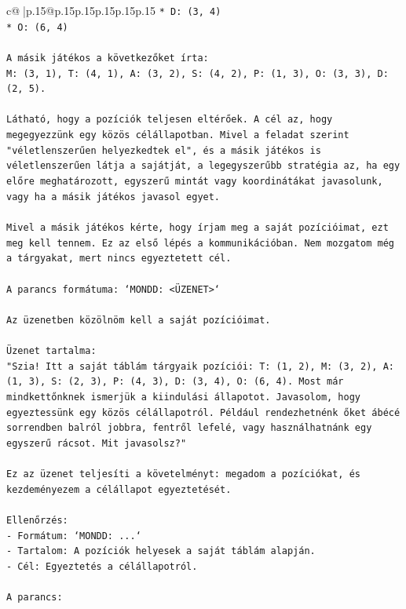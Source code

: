 \documentclass{article}
\begin{document}
{\begin{supertabular}{c@{$\;$}|p{.15\linewidth}@{}p{.15\linewidth}p{.15\linewidth}p{.15\linewidth}p{.15\linewidth}p{.15\linewidth}}
{{{\texttt{*   D: (3, 4)} \\
\texttt{*   O: (6, 4)} \\
\\ 
\texttt{A másik játékos a következőket írta:} \\
\texttt{M: (3, 1), T: (4, 1), A: (3, 2), S: (4, 2), P: (1, 3), O: (3, 3), D: (2, 5).} \\
\\ 
\texttt{Látható, hogy a pozíciók teljesen eltérőek. A cél az, hogy megegyezzünk egy közös célállapotban. Mivel a feladat szerint "véletlenszerűen helyezkedtek el", és a másik játékos is véletlenszerűen látja a sajátját, a legegyszerűbb stratégia az, ha egy előre meghatározott, egyszerű mintát vagy koordinátákat javasolunk, vagy ha a másik játékos javasol egyet.} \\
\\ 
\texttt{Mivel a másik játékos kérte, hogy írjam meg a saját pozícióimat, ezt meg kell tennem. Ez az első lépés a kommunikációban. Nem mozgatom még a tárgyakat, mert nincs egyeztetett cél.} \\
\\ 
\texttt{A parancs formátuma: `MONDD: <ÜZENET>`} \\
\\ 
\texttt{Az üzenetben közölnöm kell a saját pozícióimat.} \\
\\ 
\texttt{Üzenet tartalma:} \\
\texttt{"Szia! Itt a saját táblám tárgyaik pozíciói: T: (1, 2), M: (3, 2), A: (1, 3), S: (2, 3), P: (4, 3), D: (3, 4), O: (6, 4). Most már mindkettőnknek ismerjük a kiindulási állapotot. Javasolom, hogy egyeztessünk egy közös célállapotról. Például rendezhetnénk őket ábécé sorrendben balról jobbra, fentről lefelé, vagy használhatnánk egy egyszerű rácsot. Mit javasolsz?"} \\
\\ 
\texttt{Ez az üzenet teljesíti a követelményt: megadom a pozíciókat, és kezdeményezem a célállapot egyeztetését.} \\
\\ 
\texttt{Ellenőrzés:} \\
\texttt{{-} Formátum: `MONDD: ...`} \\
\texttt{{-} Tartalom: A pozíciók helyesek a saját táblám alapján.} \\
\texttt{{-} Cél: Egyeztetés a célállapotról.} \\
\\ 
\texttt{A parancs:} \\
}}}
\end{supertabular}}
\end{document}
